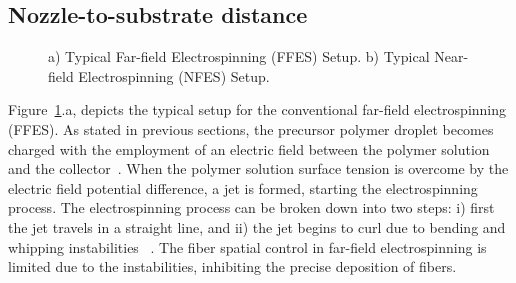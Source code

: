 \subsection{Nozzle-to-substrate distance}
\bgroup
\begin{figure}[!htbp]
\centering \makeatletter{}
\makeatother 
\caption{{a) Typical Far-field Electrospinning (FFES) Setup. b) Typical Near-field Electrospinning (NFES) Setup.}}
\label{f-c34559531e3e}
\end{figure}
\egroup
Figure~\ref{f-c34559531e3e}.a, depicts the typical setup for the conventional far-field electrospinning (FFES). As stated in previous sections, the precursor polymer droplet becomes charged with the employment of an electric field between the polymer solution and the collector\unskip~\cite{527120:14135125}. When the polymer solution surface tension is overcome by the electric field potential difference, a jet is formed, starting the electrospinning process. The electrospinning process can be broken down into two steps: i) first the jet travels in a straight line, and ii) the jet begins to curl due to bending and whipping instabilities \unskip~\cite{527120:13444381,527120:14135543}. The fiber spatial control in far-field electrospinning is limited due to the instabilities, inhibiting the precise deposition of fibers.

